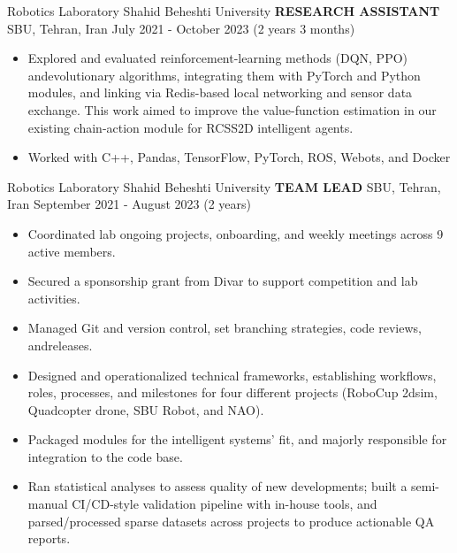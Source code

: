 
\begin{cventries}
    \cventry
    {Robotics Laboratory \textemdash Shahid Beheshti University}
    {\textbf{RESEARCH ASSISTANT}}
    {SBU, Tehran, Iran}
    {July 2021 - October 2023 (2 years 3 months)}
    {
        \begin{itemize}
            \item Explored and evaluated reinforcement-learning methods (DQN, PPO) andevolutionary algorithms, integrating them with PyTorch and Python modules, and linking via Redis-based local networking and sensor data exchange. This work aimed to improve the value-function estimation in our existing chain-action module for RCSS2D intelligent agents.
            \item  Worked with C++, Pandas, TensorFlow, PyTorch, ROS, Webots, and Docker
        \end{itemize}
    }
    \vspace{0.4 cm}
\end{cventries}

\begin{cventries}
    \cventry
    {Robotics Laboratory \textemdash Shahid Beheshti University}
    {\textbf{TEAM LEAD}}
    {SBU, Tehran, Iran}
    {September 2021 - August 2023 (2 years)}
    {
        \begin{itemize}
            \item Coordinated lab ongoing projects, onboarding, and weekly meetings across 9 active members.
            \item Secured a sponsorship grant from Divar to support competition and lab activities.
            \item Managed Git and version control, set branching strategies, code reviews, andreleases.
            \item Designed and operationalized technical frameworks, establishing workflows, roles, processes, and milestones for four different projects (RoboCup 2dsim, Quadcopter drone, SBU Robot, and NAO).
            \item Packaged modules for the intelligent systems' fit, and majorly responsible for integration to the code base.
            \item Ran statistical analyses to assess quality of new developments; built a semi-manual CI/CD-style validation pipeline with in-house tools, and parsed/processed sparse datasets across projects to produce actionable QA reports.
        \end{itemize}
    }
\end{cventries}

